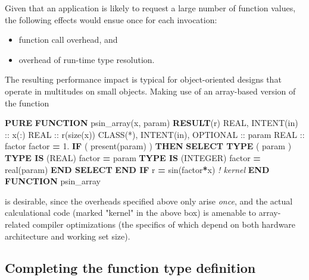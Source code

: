 \documentclass[
]{scrartcl}
\newenvironment{Shaded}{}{}
\newcommand{\BuiltInTok}[1]{\textcolor[rgb]{0.00,0.50,0.00}{#1}}
\newcommand{\CommentTok}[1]{\textcolor[rgb]{0.38,0.63,0.69}{\textit{#1}}}
\newcommand{\DataTypeTok}[1]{\textcolor[rgb]{0.56,0.13,0.00}{#1}}
\newcommand{\FloatTok}[1]{\textcolor[rgb]{0.25,0.63,0.44}{#1}}
\newcommand{\FunctionTok}[1]{\textcolor[rgb]{0.02,0.16,0.49}{#1}}
\newcommand{\KeywordTok}[1]{\textcolor[rgb]{0.00,0.44,0.13}{\textbf{#1}}}
\newcommand{\NormalTok}[1]{#1}
\providecommand{\tightlist}{%
  \setlength{\itemsep}{0pt}\setlength{\parskip}{0pt}}
\begin{document}
Given that an application is likely to request a large number of
function values, the following effects would ensue once for each
invocation:

\begin{itemize}
\tightlist
\item
  function call overhead, and
\item
  overhead of run-time type resolution.
\end{itemize}

The resulting performance impact is typical for object-oriented designs
that operate in multitudes on small objects. Making use of an
array-based version of the function

\begin{Shaded}
\begin{Highlighting}[]
\KeywordTok{PURE} \KeywordTok{FUNCTION}\NormalTok{ psin\_array(x, param) }\KeywordTok{RESULT}\NormalTok{(r)}
   \DataTypeTok{REAL}\NormalTok{, }\DataTypeTok{INTENT(in)} \DataTypeTok{::}\NormalTok{ x(:)}
   \DataTypeTok{REAL} \DataTypeTok{::}\NormalTok{ r(}\FunctionTok{size}\NormalTok{(x))}
   \DataTypeTok{CLASS(*)}\NormalTok{, }\DataTypeTok{INTENT(in)}\NormalTok{, }\DataTypeTok{OPTIONAL} \DataTypeTok{::}\NormalTok{ param}
   \DataTypeTok{REAL} \DataTypeTok{::}\NormalTok{ factor}
\NormalTok{   factor }\KeywordTok{=} \FloatTok{1.}
   \KeywordTok{IF}\NormalTok{ ( }\FunctionTok{present}\NormalTok{(param) ) }\KeywordTok{THEN}
      \KeywordTok{SELECT TYPE}\NormalTok{ ( param )}
      \KeywordTok{TYPE IS}\NormalTok{ (}\DataTypeTok{REAL}\NormalTok{)}
\NormalTok{         factor }\KeywordTok{=}\NormalTok{ param}
      \KeywordTok{TYPE IS}\NormalTok{ (}\DataTypeTok{INTEGER}\NormalTok{)}
\NormalTok{         factor }\KeywordTok{=} \DataTypeTok{real(param)}
      \KeywordTok{END SELECT}
   \KeywordTok{END IF}
\NormalTok{   r }\KeywordTok{=} \BuiltInTok{sin}\NormalTok{(factor}\KeywordTok{*}\NormalTok{x)  }\CommentTok{! kernel}
\KeywordTok{END FUNCTION}\NormalTok{ psin\_array}
\end{Highlighting}
\end{Shaded}

is desirable, since the overheads specified above only arise
\emph{once}, and the actual calculational code (marked "kernel" in the
above box) is amenable to array-related compiler optimizations (the
specifics of which depend on both hardware architecture and working set
size).

\subsection{Completing the function type
definition}\label{completing-the-function-type-definition}
\end{document}
